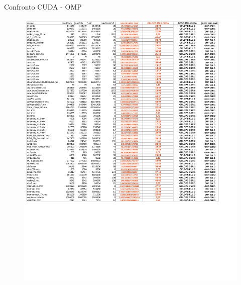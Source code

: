 \documentclass[aspectratio=1610]{beamer}
\begin{document}
\begin{frame}[t]{Confronto CUDA - OMP}
	\begin{figure}[h!]  \centering
        \includegraphics[scale=0.27]{cuda-ompConfronto.pdf}
    \end{figure}
\end{frame}
\end{document}
